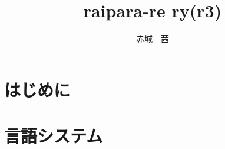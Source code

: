 \documentclass[a4paper, 12pt, titlepage]{ltjsarticle}
\title{raipara-re ry(r3)}
\author{赤城　茜}
\begin{document}
\maketitle

\tableofcontents \clearpage

\part{はじめに} \clearpage

 \clearpage

\part{言語システム} \clearpage

 \clearpage

 \clearpage

 \clearpage
 \clearpage

 \clearpage
 \clearpage
\end{document}
